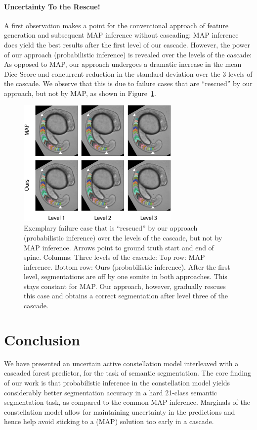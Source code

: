 \documentclass[10pt,twocolumn,letterpaper]{article}
\begin{document}
\paragraph{Uncertainty To the Rescue! }
%
A first observation makes a point for the conventional approach of feature generation and subsequent MAP inference without cascading: MAP inference does yield the best results after the first level of our cascade. However, the power of our approach (probabilistic inference) is revealed over the levels of the cascade: As opposed to MAP, our approach undergoes a dramatic increase in the mean Dice Score and concurrent reduction in the standard deviation over the 3 levels of the cascade. We observe that this is due to failure cases that are ``rescued'' by our approach, but not by MAP, as shown in Figure~\ref{fig:rescue}. 
%
\begin{figure}[t]
\begin{center}
\includegraphics[width=0.7\textwidth]{rescue.jpg} %
\caption{Exemplary failure case that is ``rescued'' by our approach (probabilistic inference) over the levels of the cascade, but not by MAP inference. Arrows point to ground truth start and end of spine. Columns: Three levels of the cascade: Top row: MAP inference. Bottom row: Ours (probabilistic inference). After the first level, segmentations are off by one somite in both approaches. This stays constant for MAP. Our approach, however, gradually rescues this case and obtains a correct segmentation after level three of the cascade.}
\label{fig:rescue}
\end{center}
\end{figure}
%

\section{Conclusion}
%
We have presented an uncertain active constellation model interleaved with a cascaded forest predictor, for the task of semantic segmentation.
%
The core finding of our work is that probabilistic inference in the constellation model yields considerably better segmentation accuracy in a hard 21-class semantic segmentation task, as compared to the common MAP inference.
%
Marginals of the constellation model allow for maintaining uncertainty in the predictions and hence help avoid sticking to a (MAP) solution too early in a cascade. 
\end{document}

